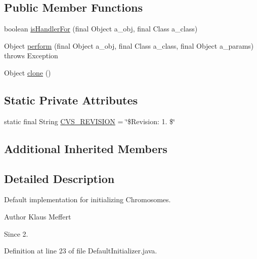\subsection*{Public Member Functions}
\begin{DoxyCompactItemize}
\item 
boolean \hyperlink{classorg_1_1jgap_1_1impl_1_1_default_initializer_ad6aa86f4a136bc60ecc04e18ee1888a7}{is\-Handler\-For} (final Object a\-\_\-obj, final Class a\-\_\-class)
\item 
Object \hyperlink{classorg_1_1jgap_1_1impl_1_1_default_initializer_acbd77c80a8d9c2b0b2b099f707baa030}{perform} (final Object a\-\_\-obj, final Class a\-\_\-class, final Object a\-\_\-params)  throws Exception 
\item 
Object \hyperlink{classorg_1_1jgap_1_1impl_1_1_default_initializer_ad63f376c81adcaa65dc89d9538524e8d}{clone} ()
\end{DoxyCompactItemize}
\subsection*{Static Private Attributes}
\begin{DoxyCompactItemize}
\item 
static final String \hyperlink{classorg_1_1jgap_1_1impl_1_1_default_initializer_afdc706caafff095c769091f4cfd24ae4}{C\-V\-S\-\_\-\-R\-E\-V\-I\-S\-I\-O\-N} = \char`\"{}\$Revision\-: 1. \$\char`\"{}
\end{DoxyCompactItemize}
\subsection*{Additional Inherited Members}


\subsection{Detailed Description}
Default implementation for initializing Chromosomes.

\begin{DoxyAuthor}{Author}
Klaus Meffert 
\end{DoxyAuthor}
\begin{DoxySince}{Since}
2. 
\end{DoxySince}


Definition at line 23 of file Default\-Initializer.\-java.




